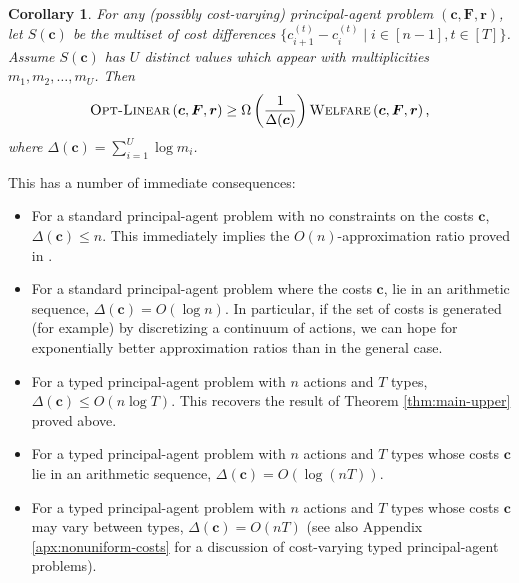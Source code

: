 \documentclass{article}
\newtheorem{corollary}[theorem]{Corollary}
\newcommand{\costvector}{\bm{c}}
\newcommand{\CostVector}{\bm{c}}
\newcommand{\ForecastTensor}{\bm{F}}
\newcommand{\rewardvector}{\bm{r}}
\newcommand{\PrincipalAgentProblem}{\left(\costvector, \ForecastTensor, \rewardvector\right)}
\newcommand{\OWelfare}{\textsc{Welfare}}
\newcommand{\OLinear}{\textsc{Opt-Linear}}
\begin{document}
\begin{corollary}
\label{cor:main-upper}
For any (possibly cost-varying) principal-agent problem $\PrincipalAgentProblem$, let $S(\CostVector{})$ be the multiset of cost differences $\{c^{(t)}_{i+1} - c_{i}^{(t)} \mid i \in [n-1], t \in [T]\}$. Assume $S(\CostVector{})$ has $U$ distinct values which appear with multiplicities $m_1, m_2, \dots, m_U$. Then
\begin{align*}
  \OLinear \PrincipalAgentProblem \ge \Omega \left(\frac{1}{ \Delta(\CostVector{}) }\right) \OWelfare \PrincipalAgentProblem\text{,}
\end{align*}
 where $\Delta(\CostVector{}) = \sum_{i=1}^{U} \log m_i$.
\end{corollary}



This has a number of immediate consequences:

\begin{itemize}
    \item 
    For a standard principal-agent problem with no constraints on the costs $\CostVector{}$, $\Delta(\CostVector) \leq n$. This immediately implies the $O(n)$-approximation ratio proved in \cite{dutting2019simple}.
    \item
    For a standard principal-agent problem where the costs $\CostVector{}$, lie in an arithmetic sequence, $\Delta(\CostVector) = O(\log n)$. In particular, if the set of costs is generated (for example) by discretizing a continuum of actions, we can hope for exponentially better approximation ratios than in the general case.
    \item
    For a typed principal-agent problem with $n$ actions and $T$ types, $\Delta(\CostVector) \leq O(n \log T)$. This recovers the result of Theorem \ref{thm:main-upper} proved above.
    \item 
    For a typed principal-agent problem with $n$ actions and $T$ types whose costs $\CostVector{}$ lie in an arithmetic sequence, $\Delta(\CostVector) = O(\log(nT))$.
    \item
    For a typed principal-agent problem with $n$ actions and $T$ types whose costs $\CostVector{}$ may vary between types, $\Delta(\CostVector) = O(nT)$ (see also Appendix \ref{apx:nonuniform-costs} for a discussion of cost-varying typed principal-agent problems).
\end{itemize}
\end{document}
